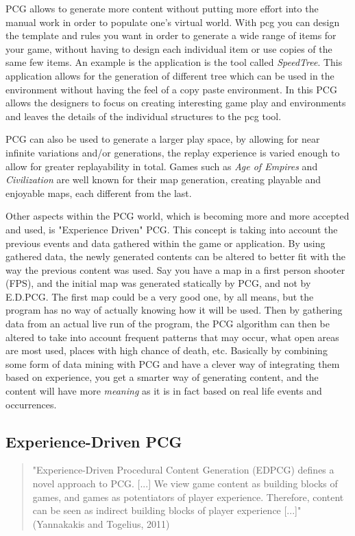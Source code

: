 PCG allows to generate more content without putting more effort into the manual work in order to populate one's virtual world. With pcg you can design the template and rules you want in order to generate a wide range of items for your game, without having to design each individual item or use copies of the same few items. An example is the application is the tool called \textit{SpeedTree}. This application allows for the generation of different tree which can be used in the environment without having the feel of a copy paste environment. In this PCG allows the designers to focus on creating interesting game play and environments and leaves the details of the individual structures to the pcg tool. 

PCG can also be used to generate a larger play space, by allowing for near infinite variations and/or generations, the replay experience is varied enough to allow for greater replayability in total. Games such as \textit{Age of Empires} and \textit{Civilization} are well known for their map generation, creating playable and enjoyable maps, each different from the last.


Other aspects within the PCG world, which is becoming more and more accepted and used, is "Experience Driven" PCG\cite{art:exppcg}. This concept is taking into account the previous events and data gathered within the game or application. By using gathered data, the newly generated contents can be altered to better fit with the way the previous content was used. Say you have a map in a first person shooter (FPS), and the initial map was generated statically by PCG, and not by E.D.PCG. The first map could be a very good one, by all means, but the program has no way of actually knowing how it will be used. Then by gathering data from an actual live run of the program, the PCG algorithm can then be altered to take into account frequent patterns that may occur, what open areas are most used, places with high chance of death, etc. Basically by combining some form of data mining with PCG and have a clever way of integrating them based on experience, you get a smarter way of generating content, and the content will have more \textit{meaning} as it is in fact based on real life events and occurrences.

\subsection{Experience-Driven PCG}
\begin{quotation} 
"Experience-Driven Procedural Content Generation (EDPCG) defines a novel approach to PCG. [...] We view game content as building blocks of games, and games as potentiators of player experience. Therefore, content can be seen as indirect building blocks of player experience [...]" (Yannakakis and Togelius, 2011) \cite{art:edpcg}
\end{quotation}

